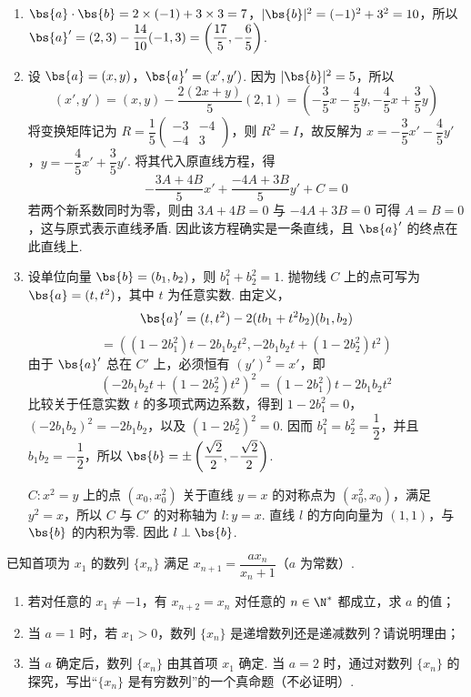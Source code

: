 \begin{solution}
\begin{enumerate}
\item \(\bs{a}\cdot\bs{b}=2\times(-1)+3\times3=7\)，\(|\bs{b}|^2=(-1)^2+3^2=10\)，所以 \(\bs{a}'=(2,3)-\dfrac{14}{10}(-1,3)=\left(\dfrac{17}{5},-\dfrac65\right)\).

\item 设 \(\bs{a}=(x,y)\)，\(\bs{a}'=(x',y')\). 因为 \(|\bs{b}|^2=5\)，所以
\[
(x',y')=(x,y)-\frac{2(2x+y)}{5}(2,1)=\left(-\frac35x-\frac45y,-\frac45x+\frac35y\right)
\]
将变换矩阵记为 \(R=\dfrac15\begin{pmatrix}-3&-4\\-4&3\end{pmatrix}\)，则 \(R^2=I\)，故反解为 \(x=-\dfrac35x'-\dfrac45y'\)，\(y=-\dfrac45x'+\dfrac35y'\). 将其代入原直线方程，得
\[
-\frac{3A+4B}{5}x'+\frac{-4A+3B}{5}y'+C=0
\]
若两个新系数同时为零，则由 \(3A+4B=0\) 与 \(-4A+3B=0\) 可得 \(A=B=0\)，这与原式表示直线矛盾. 因此该方程确实是一条直线，且 \(\bs{a}'\) 的终点在此直线上.

\item 设单位向量 \(\bs{b}=(b_1,b_2)\)，则 \(b_1^2+b_2^2=1\). 抛物线 \(C\) 上的点可写为 \(\bs{a}=(t,t^2)\)，其中 \(t\) 为任意实数. 由定义，
\[
\bs{a}'=(t,t^2)-2(tb_1+t^2b_2)(b_1,b_2)
\]
\[
=\left((1-2b_1^2)t-2b_1b_2t^2,-2b_1b_2t+(1-2b_2^2)t^2\right)
\]
由于 \(\bs{a}'\) 总在 \(C'\) 上，必须恒有 \((y')^2=x'\)，即
\[
\left(-2b_1b_2t+(1-2b_2^2)t^2\right)^2=(1-2b_1^2)t-2b_1b_2t^2
\]
比较关于任意实数 \(t\) 的多项式两边系数，得到 \(1-2b_1^2=0\)，\((-2b_1b_2)^2=-2b_1b_2\)，以及 \((1-2b_2^2)^2=0\). 因而 \(b_1^2=b_2^2=\dfrac12\)，并且 \(b_1b_2=-\dfrac12\)，所以 \(\bs{b}=\pm\left(\dfrac{\sqrt2}{2},-\dfrac{\sqrt2}{2}\right)\).

\(C:x^2=y\) 上的点 \((x_0,x_0^2)\) 关于直线 \(y=x\) 的对称点为 \((x_0^2,x_0)\)，满足 \(y^2=x\)，所以 \(C\) 与 \(C'\) 的对称轴为 \(l:y=x\). 直线 \(l\) 的方向向量为 \((1,1)\)，与 \(\bs{b}\) 的内积为零. 因此 \(l\perp\bs{b}\).
\end{enumerate}
\end{solution}

\begin{problem}
已知首项为 \(x_1\) 的数列 \(\{x_n\}\) 满足 \(x_{n+1}=\dfrac{ax_n}{x_n+1}\)（\(a\) 为常数）.

\begin{enumerate}
\item 若对任意的 \(x_1\ne-1\)，有 \(x_{n+2}=x_n\) 对任意的 \(n\in\N^*\) 都成立，求 \(a\) 的值；
\item 当 \(a=1\) 时，若 \(x_1>0\)，数列 \(\{x_n\}\) 是递增数列还是递减数列？请说明理由；
\item 当 \(a\) 确定后，数列 \(\{x_n\}\) 由其首项 \(x_1\) 确定. 当 \(a=2\) 时，通过对数列 \(\{x_n\}\) 的探究，写出“\(\{x_n\}\) 是有穷数列”的一个真命题（不必证明）.
\end{enumerate}
\end{problem}

